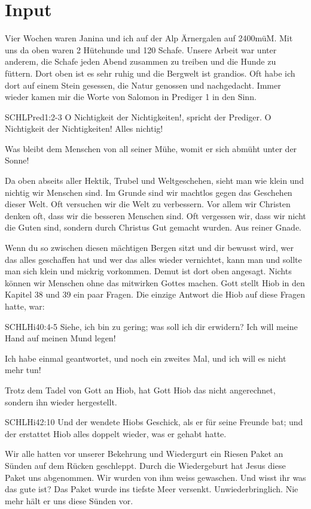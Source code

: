 \documentclass{../../inc/mybib}
\begin{document}
\section{ Input }
\begin{spacing}{1.5}
Vier Wochen waren Janina und ich auf der Alp Ärnergalen auf 2400müM. Mit uns da oben waren 2 Hütehunde und 120 Schafe. Unsere Arbeit war unter anderem, die Schafe jeden Abend zusammen zu treiben und die Hunde zu füttern. Dort oben ist es sehr ruhig und die Bergwelt ist grandios. Oft habe ich dort auf einem Stein gesessen, die Natur genossen und nachgedacht. Immer wieder kamen mir die Worte von Salomon in Prediger 1 in den Sinn.
\begin{bibelbox}{SCHL}{Pred}{1:2-3}
   O Nichtigkeit der Nichtigkeiten!, spricht der Prediger. O Nichtigkeit der Nichtigkeiten! Alles nichtig!

   Was bleibt dem Menschen von all seiner Mühe, womit er sich abmüht unter der Sonne!
\end{bibelbox}
Da oben abseits aller Hektik, Trubel und Weltgeschehen, sieht man wie klein und nichtig wir Menschen sind. Im Grunde sind wir machtlos gegen das Geschehen dieser Welt. Oft versuchen wir die Welt zu verbessern. Vor allem wir Christen denken oft, dass wir die besseren Menschen sind. Oft vergessen wir, dass wir nicht die Guten sind, sondern durch Christus Gut gemacht wurden. Aus reiner Gnade. 

Wenn du so zwischen diesen mächtigen Bergen sitzt und dir bewusst wird, wer das alles geschaffen hat und wer das alles wieder vernichtet, kann man und sollte man sich klein und mickrig vorkommen. Demut ist dort oben angesagt. Nichts können wir Menschen ohne das mitwirken Gottes machen. Gott stellt Hiob in den Kapitel 38 und 39 ein paar Fragen. Die einzige Antwort die Hiob auf diese Fragen hatte, war:
\begin{bibelbox}{SCHL}{Hi}{40:4-5}
    Siehe, ich bin zu gering; was soll ich dir erwidern? Ich will meine Hand auf meinen Mund legen!

    Ich habe einmal geantwortet, und noch ein zweites Mal, und ich will es nicht mehr tun!
\end{bibelbox}
    Trotz dem Tadel von Gott an Hiob, hat Gott Hiob das nicht angerechnet, sondern ihn wieder hergestellt.
\begin{bibelbox}{SCHL}{Hi}{42:10}
    Und der \herr wendete Hiobs Geschick, als er für seine Freunde bat; und der \herr erstattet Hiob alles doppelt wieder, was er gehabt hatte.
\end{bibelbox}
Wir alle hatten vor unserer Bekehrung und Wiedergurt ein Riesen Paket an Sünden auf dem Rücken geschleppt. Durch die Wiedergeburt hat Jesus diese Paket uns abgenommen. Wir wurden von ihm weiss gewaschen. Und wisst ihr was das gute ist? Das Paket wurde ins tiefste Meer versenkt. Unwiederbringlich. Nie mehr hält er uns diese Sünden vor.


\end{spacing}
\end{document}

